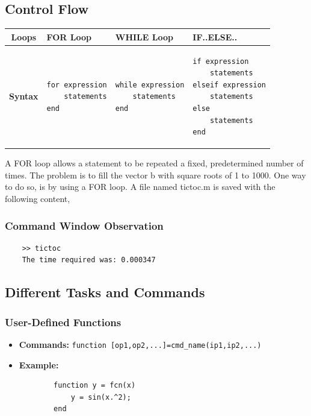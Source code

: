 \documentclass{lab_sheet}
\begin{document}
\subsection{Control Flow}
\begin{table}[H]
    \centering
    \begin{tabular}{ |c|v{3.2cm}|v{3.5cm}|v{3.8cm}| }
        \hline
        \textbf{Loops}&\textbf{FOR Loop}&\textbf{WHILE Loop}&\textbf{IF..ELSE..}\\
        \hline\hline
        \textbf{Syntax}& 
        \begin{verbatim}
for expression
    statements
end
        \end{verbatim}
        &
        \begin{verbatim}
while expression
    statements
end
        \end{verbatim}
        &
        \begin{verbatim}
if expression
    statements
elseif expression
    statements
else
    statements
end
\end{verbatim}
        \\
        \hline
    \end{tabular}
\end{table}
A FOR loop allows a statement to be repeated a fixed, predetermined number of times. The problem is to fill the vector b with square roots of 1 to 1000. One way to do so, is by using a FOR loop. A file named tictoc.m is saved with the following content,
\subsubsection*{Command Window Observation}
\begin{verbatim}
    >> tictoc
    The time required was: 0.000347
\end{verbatim}
\subsection{Different Tasks and Commands}
\subsubsection{User-Defined Functions}
\begin{itemize}
    \item \textbf{Commands:} \texttt{function [op1,op2,...]=cmd\_name(ip1,ip2,...)}
    \item \textbf{Example:}
    \begin{verbatim}
        function y = fcn(x)
            y = sin(x.^2);
        end
\end{verbatim}
\end{itemize}
\end{document}
